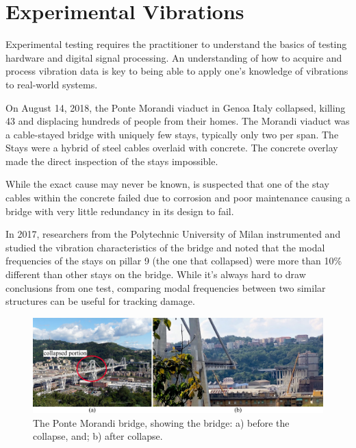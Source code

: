 \documentclass[12pt,letter]{article}
\begin{document}
	
	\setcounter{section}{6}	
	\setcounter{figure}{0}   
	\renewcommand\thefigure{\thesection.\arabic{figure}}
	\setcounter{equation}{0}   
	\renewcommand\theequation{\thesection.\arabic{equation}}

	\section{Experimental Vibrations}
	
Experimental testing requires the practitioner to understand the basics of testing hardware and digital signal processing. An understanding of how to acquire and process vibration data is key to being able to apply one's knowledge of vibrations to real-world systems.


\begin{vibration_case_study}

	On August 14, 2018, the Ponte Morandi viaduct in Genoa Italy collapsed, killing 43 and displacing hundreds of people from their homes. The Morandi viaduct was a cable-stayed bridge with uniquely few stays, typically only two per span. The Stays were a hybrid of steel cables overlaid with concrete. The concrete overlay made the direct inspection of the stays impossible. 
	
	While the exact cause may never be known, is suspected that one of the stay cables within the concrete failed due to corrosion and poor maintenance causing a bridge with very little redundancy in its design to fail\protect\footnotemark[1].
	
	In 2017, researchers from the Polytechnic University of Milan instrumented and studied the vibration characteristics of the bridge and noted that the modal frequencies of the stays on pillar 9 (the one that collapsed) were more than 10\% different than other stays on the bridge. While it's always hard to draw conclusions from one test, comparing modal frequencies between two similar structures can be useful for tracking damage. 
 
	\begin{figure}[H]
		\centering
		\includegraphics[width=6in]{../figures/ponte_morandi_bridge}
		\caption{The Ponte Morandi bridge, showing the bridge: a) before the collapse\protect\footnotemark[2], and; b) after collapse\protect\footnotemark[3]. }
	\end{figure}
		

\end{vibration_case_study}
\end{document}
